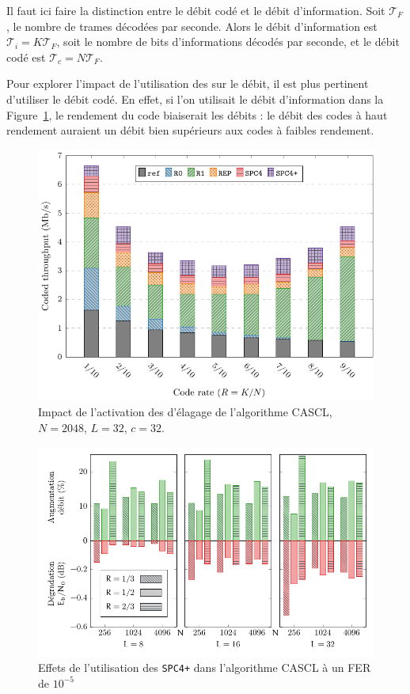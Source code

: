 Il faut ici faire la distinction entre le débit codé  et le débit d'information. Soit $\mathcal{T}_F$, le nombre de trames décodées par seconde. Alors le débit d'information est $\mathcal{T}_i=K\mathcal{T}_F$, soit le nombre de bits d'informations décodés par seconde, et le débit codé est $\mathcal{T}_c=N\mathcal{T}_F$.

Pour explorer l'impact de l'utilisation des \noeuds sur le débit, il est  plus pertinent d'utiliser le débit codé. En effet, si l'on utilisait le débit d'information dans la Figure~\ref{fig:nodes}, le rendement du code biaiserait les débits : le débit des codes à haut rendement auraient un débit bien supérieurs aux codes à faibles rendement.
\begin{figure}[t]
\includegraphics[width=\textwidth]{main/ch2_fig/curves/tree/tikz/tree}
\caption{Impact de l'activation des \noeuds d'élagage de l'algorithme CASCL, $N=2048$, $L=32$, $c=32$.}
\label{fig:nodes}
\end{figure}

\begin{figure}[t]
\includegraphics[width=\textwidth]{main/ch2_fig/curves/thr_spc/tikz/thr_spc_diff}
\caption{Effets de l'utilisation des \noeuds \texttt{SPC4+} dans l'algorithme CASCL à un FER de $10^{-5}$}
\label{fig:spc_impact}
\end{figure}

